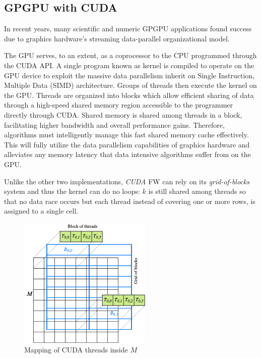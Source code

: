 \subsection{GPGPU with CUDA}
In recent years, many scientific and numeric GPGPU applications found success due to graphics hardware’s streaming data-parallel organizational model. 

The GPU serves, to an extent, as a coprocessor to the
CPU programmed through the CUDA API. A single program known as kernel is compiled to operate on the GPU
device to exploit the massive data parallelism inherit on Single Instruction, Multiple Data (SIMD) architecture. Groups
of threads then execute the kernel on the GPU. Threads
are organized into blocks which allow efficient sharing of
data through a high-speed shared memory region accessible to the programmer
directly through CUDA. Shared memory is shared among
threads in a block, facilitating higher bandwidth and overall
performance gains. Therefore, algorithms must intelligently
manage this fast shared memory cache effectively. This
will fully utilize the data parallelism capabilities of graphics
hardware and alleviates any memory latency that data intensive algorithms suffer from on the GPU.

Unlike the other two implementations, \emph{CUDA} FW can rely on its \emph{grid-of-blocks} system and thus the kernel can do no loops: $k$ is still shared among threads
so that no data race occurs but each thread instead of covering one or more rows, is assigned to a single cell. 



\begin{figure}[h!]
\centering                                                                        
\includegraphics[width=2.5in]{diagrams/cuda-threads}
\captionsetup{justification=centering}                                                                                                                                   
\caption{Mapping of CUDA threads inside $M$}                                                                                                                                            
\label{fig:cuda-threads}                                                                                                                                                           
\end{figure}


